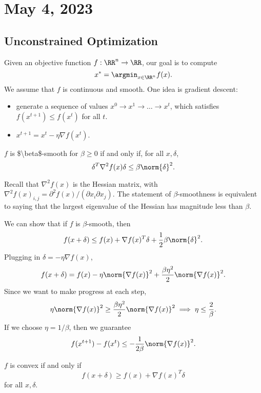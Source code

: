 \section{May 4, 2023}

\subsection{Unconstrained Optimization}

Given an objective function $f:\RR^n\rightarrow \RR$, our goal is to compute
\[x^* = \argmin_{x\in \RR^n}f(x).\]
We assume that $f$ is continuous and smooth. One idea is \ac{gradient descent}:
\begin{itemize}
    \item generate a sequence of values $x^0\rightarrow x^1\rightarrow \hdots \rightarrow x^t$, which satisfies $f(x^{t+1})\leq f(x^t)$ for all $t$. 
    \item $x^{t+1} = x^t - \eta \nabla f(x^t)$.
\end{itemize}

\begin{definition}

$f$ is \ac{$\beta$-smooth} for $\beta\geq 0$ if and only if, for all $x,\delta$, 
\[\delta^T\nabla^2f(x)\delta \leq \beta \norm{\delta}^2.\]
\end{definition}

Recall that $\nabla^2f(x)$ is the Hessian matrix, with $\nabla^2f(x)_{i,j} = \partial^2f(x)/(\partial x_i\partial x_j)$. The statement of $\beta$-smoothness is equivalent to saying that the largest eigenvalue of the Hessian has magnitude less than $\beta$. 

We can show that if $f$ is $\beta$-smooth, then 
\[f(x+\delta) \leq f(x) + \nabla f(x)^T\delta + \frac{1}{2}\beta \norm{\delta}^2.\]
Plugging in $\delta = -\eta \nabla f(x)$,
\[f(x+\delta) = f(x) - \eta \norm{\nabla f(x)}^2 + \frac{\beta \eta^2}{2}\norm{\nabla f(x)}^2.\]
Since we want to make progress at each step, 
\[\eta \norm{\nabla f(x)}^2 \geq \frac{\beta\eta^2}{2}\norm{\nabla f(x)}^2\implies \eta \leq \frac{2}{\beta}.\]
If we choose $\eta = 1/\beta$, then we guarantee 
\[f(x^{t+1})-f(x^t) \leq -\frac{1}{2\beta}\norm{\nabla f(x)}^2.\]

\begin{definition}

$f$ is convex if and only if 
\[f(x+\delta) \geq f(x) + \nabla f(x)^T\delta\]
for all $x,\delta$.
\end{definition}

